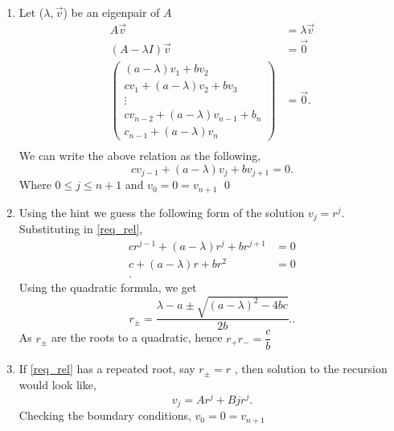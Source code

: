 \documentclass{report}
\begin{document}
\begin{solution}
	\begin{enumerate}[label=(\alph*)]
		\item Let ($\lambda, \vec{v}$) be an eigenpair of $A$
		      \begin{align*}
			      A\vec{v}                                 & =   \lambda \vec{v} \\
			      \left( A - \lambda I \right)\vec{v}      & = \vec{0}           \\
			      \left(\begin{array}{ccccc}
					            \left( a-\lambda \right) v_1 + bv_2   \\
					            cv_1 + (a-\lambda)v_2 + bv_3          \\
					            \vdots                                \\
					            cv_{n-2} + (a-\lambda) v_{n-1}+ b_{n} \\
					            c_{n-1} + (a-\lambda) v_{n}
				            \end{array}   \right) & = \vec{0} .                    \\
		      \end{align*}
		      We can write the above relation as the following,
		      \begin{equation}
			      cv_{j-1} + \left( a-\lambda \right) v_{j} + bv_{j+1} = 0  \label{req_rel}
			      . \end{equation}
		      Where  $0\le j \le n+1$ and $v_{0} = 0 = v_{n+1}$
		      \qed
		\item Using the hint we guess the following form of the solution $v_{j} = r^j$. Substituting in \ref{req_rel},
		      \begin{align*}
			      cr^{j-1} + \left( a-\lambda \right) r^{j} + br^{j+1} & =   0 \\
			      c + \left( a-\lambda \right) r + br^{2}              & =   0 \\
			      .\end{align*}
		      Using the quadratic formula, we get
		      \[
			      r_{\pm} = \frac{\lambda -a \pm \sqrt{(a-\lambda)^2 - 4bc} }{ 2b}.
			      .\]
		      As $r_{\pm}$ are the roots to a quadratic, hence $r_{+}r_{-} = \dfrac{c}{b}$
		\item If \ref{req_rel} has a repeated root, say $r_{\pm} = r $ , then solution to the recursion would look like,
		      \[
			      v_{j} = Ar^j + Bjr^j
			      .\]
		      Checking the boundary conditions,
		      $v_{0} = 0= v_{n+1}$

\end{enumerate}
\end{solution}
\end{document}
